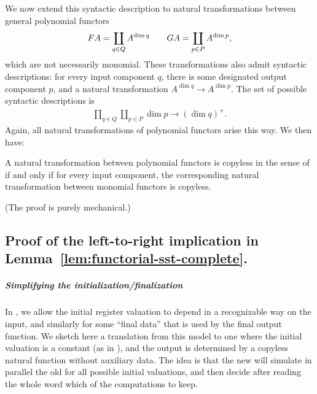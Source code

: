 We now extend this syntactic description to natural transformations between general polynomial functors 
\begin{align*}
\functor A = \coprod_{q \in Q} A^{\dim q} \qquad 
\functorg A = \coprod_{p \in P} A^{\dim p},
\end{align*}
which are not necessarily monomial. These transformations also admit syntactic descriptions: for every input component $q$, there is some designated output component $p$, and a natural transformation $A^{\dim q} \to A^{\dim p}$.  The set of possible syntactic descriptions is
\begin{align*}
\prod_{q \in Q} \coprod_{p \in P} \dim p \to (\dim q)^+.
\end{align*}
Again, all natural transformations of polynomial functors arise this way.
We then have:
\begin{claim}
  A natural transformation between polynomial functors is copyless in the sense of  if and only if for every input component, the corresponding natural transformation between monomial functors is copyless.
\end{claim}

(The proof is purely mechanical.)

\subsection{Proof of the left-to-right implication in Lemma~\ref{lem:functorial-sst-complete}.}

\subparagraph{Simplifying the initialization/finalization}

In , we allow the initial register valuation to depend in a recognizable way on the input, and similarly for some \enquote{final data} that is used by the final output function. We sketch here a translation from this model to one where the initial valuation is a constant (as in ), and the output is determined by a copyless natural function without auxiliary data. The idea is that the new \sst will simulate in parallel the old \sst for all possible initial valuations, and then decide after reading the whole word which of the computations to keep.

